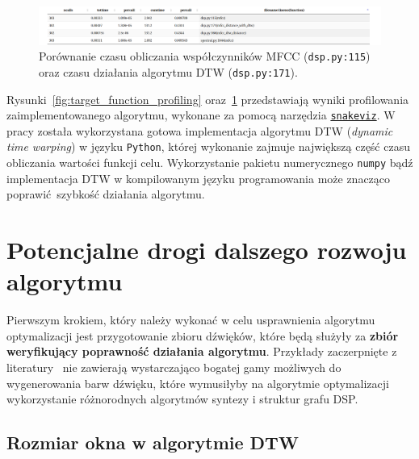 \begin{figure}[H]
    \centering
    \includegraphics[width=1.0\linewidth]{rys07/mfcc_search.png}
    \caption{
      Porównanie czasu obliczania współczynników MFCC (\texttt{dsp.py:115})
      oraz czasu działania algorytmu DTW (\texttt{dsp.py:171}).
    }\label{fig:mfcc_profiling}
\end{figure}

Rysunki~\ref{fig:target_function_profiling} oraz~\ref{fig:mfcc_profiling}
przedstawiają wyniki profilowania zaimplementowanego algorytmu, wykonane
za pomocą narzędzia \href{https://jiffyclub.github.io/snakeviz/}{\texttt{snakeviz}}.
W pracy została wykorzystana gotowa implementacja
algorytmu DTW (\textit{dynamic time warping}) w języku \texttt{Python}, której
wykonanie zajmuje największą część czasu obliczania wartości funkcji celu.
Wykorzystanie pakietu numerycznego \texttt{numpy} bądź implementacja DTW w
kompilowanym języku programowania może znacząco poprawić szybkość działania algorytmu.


\section{Potencjalne drogi dalszego rozwoju algorytmu}

Pierwszym krokiem, który należy wykonać w celu usprawnienia
algorytmu optymalizacji jest przygotowanie zbioru dźwięków,
które będą służyły za \textbf{zbiór weryfikujący poprawność działania algorytmu}.
Przykłady zaczerpnięte z literatury~\cite{evolutionary_puredata_results}
nie zawierają wystarczająco bogatej gamy możliwych do wygenerowania
barw dźwięku, które wymusiłyby na algorytmie optymalizacji wykorzystanie
różnorodnych algorytmów syntezy i struktur grafu DSP\@.



\subsection{Rozmiar okna w algorytmie DTW}


